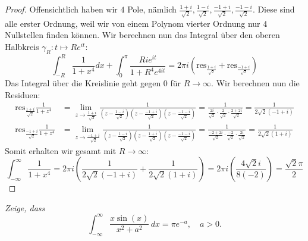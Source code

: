 \documentclass[11pt]{article}
\newcommand{\res}{\text{res}}
\newenvironment{problem}[2][Beispiel]{
    \begin{trivlist}
        \item[\hskip \labelsep {\bfseries #1}\hskip \labelsep {\bfseries #2.}] \itshape}{
    \end{trivlist}\normalshape
}
\begin{document}
    \begin{proof}
        Offensichtlich haben wir $4$ Pole, nämlich $\frac{1+i}{\sqrt{2}},\frac{1-i}{\sqrt{2}},
        \frac{-1+i}{\sqrt{2}}, \frac{-1-i}{\sqrt{2}}$. Diese sind alle erster Ordnung, weil
        wir von einem Polynom vierter Ordnung nur $4$ Nullstellen finden können. Wir berechnen nun das Integral
        über den oberen Halbkreis $\gamma_R: t\mapsto Re^{it}$:
        $$\int_{-R}^R \frac{1}{1+x^4}dx + \int_{0}^{\pi}\frac{Rie^{it}}{1+R^4e^{4it}} =
        2\pi i(\res_{\frac{1+i}{\sqrt{2}}} + \res_{\frac{-1+i}{\sqrt{2}}})$$
        Das Integral über die Kreislinie geht gegen $0$ für $R\to\infty$. Wir berechnen nun die Residuen:
        $$\begin{aligned}
              \res_{\frac{1+i}{\sqrt{2}}} \frac{1}{1+z^4}&= \lim_{z\to \frac{1+i}{\sqrt{2}}}\frac{1}
              {(z-\frac{1-i}{\sqrt{2}})(z-\frac{-1+i}{\sqrt{2}})(z-\frac{-1-i}{\sqrt{2}})} = 
              \frac{1}{\frac{2i}{\sqrt{2}}\cdot \frac{2}{\sqrt{2}}\cdot \frac{2+2i}{\sqrt{2}}} =
              \frac{1}{2\sqrt{2}(-1+i)}\\
              \res_{\frac{-1+i}{\sqrt{2}}} \frac{1}{1+z^4}&= \lim_{z\to \frac{-1+i}{\sqrt{2}}}\frac{1}
              {(z-\frac{1-i}{\sqrt{2}})(z-\frac{1+i}{\sqrt{2}})(z-\frac{-1-i}{\sqrt{2}})} =
              \frac{1}{\frac{-2+2i}{\sqrt{2}}\cdot \frac{-2}{\sqrt{2}}\cdot \frac{2i}{\sqrt{2}}} =
              \frac{1}{2\sqrt{2}(1+i)}
        \end{aligned}$$
        Somit erhalten wir gesamt mit $R\to\infty$:
        $$\int_{-\infty}^{\infty}\frac{1}{1+x^4}=2\pi i \left(\frac{1}{2\sqrt{2}(-1+i)}+\frac{1}{2\sqrt{2}(1+i)}\right)
        =2\pi i \left(\frac{4\sqrt{2}i}{8(-2)}\right) = \frac{\sqrt{2}\pi}{2}$$
    \end{proof}

    \begin{problem}{4}
        Zeige, dass
        $$\int_{-\infty}^\infty \frac{x\sin(x)}{x^2+a^2}\,dx = \pi e^{-a},\quad a>0.$$
    \end{problem}
\end{document}
